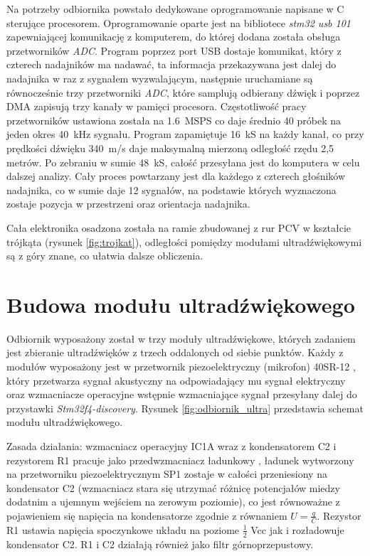 Na potrzeby odbiornika powstało dedykowane oprogramowanie napisane w C sterujące procesorem.
Oprogramowanie oparte jest na bibliotece \textit{stm32 usb 101} \cite{bib:stm32_usb_101}
zapewniającej komunikację z komputerem, do której dodana została obsługa przetworników \textit{ADC}.
Program poprzez port USB dostaje komunikat, który z czterech nadajników ma nadawać, ta informacja przekazywana jest
dalej do nadajnika w raz z sygnałem wyzwalającym, następnie uruchamiane są równocześnie trzy przetworniki \textit{ADC}, które 
samplują odbierany dźwięk i poprzez DMA zapisują trzy kanały w pamięci procesora.
Częstotliwość pracy przetworników ustawiona została na \SI{1,6}{MSPS} co daje średnio 40 próbek na jeden okres \SI{40}{kHz} sygnału.
Program zapamiętuje \SI{16}{kS} na każdy kanał, co przy prędkości dźwięku \SI{340}{m/s} daje maksymalną mierzoną odległość rzędu 2,5 metrów.
Po zebraniu w sumie \SI{48}{kS}, całość przesyłana jest do komputera w celu dalszej analizy.
Cały proces powtarzany jest dla każdego z czterech głośników nadajnika, 
co w sumie daje 12 sygnałów, na podstawie których wyznaczona zostaje 
pozycja w przestrzeni oraz orientacja nadajnika.

Cała elektronika osadzona została na ramie zbudowanej z rur PCV w kształcie trójkąta (rysunek \ref{fig:trojkat}), 
odległości pomiędzy modułami ultradźwiękowymi są z góry znane, co ułatwia dalsze obliczenia.




\clearpage
\section{Budowa modułu ultradźwiękowego}

Odbiornik wyposażony został w trzy moduły ultradźwiękowe, których zadaniem jest 
zbieranie ultradźwięków z trzech oddalonych od siebie punktów.
Każdy z modułów wyposażony jest w przetwornik piezoelektryczny (mikrofon) 40SR-12 \cite{bib:40ST12},
który przetwarza sygnał akustyczny na odpowiadający mu sygnał elektryczny oraz wzmacniacze operacyjne 
wstępnie wzmacniające sygnał przesyłany dalej do przystawki \textit{Stm32f4-discovery}.
Rysunek \ref{fig:odbiornik_ultra} przedstawia schemat modułu ultradźwiękowego.


Zasada działania: wzmacniacz operacyjny IC1A wraz z kondensatorem C2 i rezystorem R1 pracuje 
jako przedwzmacniacz ładunkowy \cite{bib:wzm_ladunkowy},
ładunek wytworzony na przetworniku piezoelektrycznym SP1 zostaje w całości przeniesiony na kondensator C2 
(wzmacniacz stara się utrzymać różnicę potencjałów miedzy dodatnim a ujemnym wejściem na zerowym poziomie),
co jest równoważne z pojawieniem się napięcia na kondensatorze zgodnie z równaniem $U=\frac{q}{C}$.
Rezystor R1 ustawia napięcia spoczynkowe układu na poziome $\frac{1}{2}$ Vcc jak i rozładowuje kondensator C2.
R1 i C2 działają również jako filtr górnoprzepustowy.

